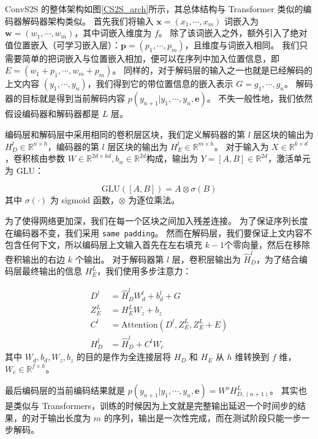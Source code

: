 ConvS2S 的整体架构如图\ref{CS2S_arch}所示，其总体结构与 Transformer 类似的编码器解码器架构类似。
首先我们将输入 $\bm{x} = (x_1, \cdots, x_m)$ 词嵌入为 $\bm{w} = (w_1, \cdots, w_m)$，其中词嵌入维度为 $f$。
除了该词嵌入之外，额外引入了绝对值位置嵌入（可学习嵌入层）：$\bm{p} = (p_1, \cdots, p_m)$，且维度与词嵌入相同。
我们只需要简单的把词嵌入与位置嵌入相加，便可以在序列中加入位置信息，即 $E = (w_1 + p_1, \cdots, w_m + p_m)$。
同样的，对于解码层的输入之一也就是已经解码的上文内容 $(y_1, \cdots, y_n)$，我们得到它的带位置信息的嵌入表示 $G = g_1, \cdots, g_n$。
解码器的目标就是得到当前解码内容 $p(y_{n+1}|y_1,\cdots,y_n, \bm{e})$。
不失一般性地，我们依然假设编码器和解码器都是 $L$ 层。

编码层和解码层中采用相同的卷积层区块，我们定义解码器的第 $l$ 层区块的输出为 $H_D^l \in \mathbb{R}^{n \times h}$，编码器的第 $l$ 层区块的输出为 $H_E^l \in \mathbb{R}^{m \times h}$。
对于输入为 $X \in \mathbb{R}^{k \times d}$，卷积核由参数 $W \in \mathbb{R}^{2d \times kd}, b_w \in \mathbb{R}^{2d}$构成，输出为 $Y = [A, B] \in \mathbb{R}^{2d}$，激活单元为 GLU\cite{GLU}：

\begin{equation}
	\text{GLU}([A, B]) = A \otimes \sigma(B)
\end{equation}
其中 $\sigma(\cdot)$ 为 sigmoid 函数，$\otimes$ 为逐位乘法。

为了使得网络更加深，我们在每一个区块之间加入残差连接。
为了保证序列长度在编码器不变，我们采用 \texttt{same padding}。
然而在解码层，我们要保证上文内容不包含任何下文，所以编码层上文输入首先在左右填充 $k-1$个零向量，然后在移除卷积输出的右边 $k$ 个输出。
对于解码器第 $l$ 层，卷积层输出为 $\hat{H}_D^l$，为了结合编码层最终输出的信息 $H_E^L$，我们使用多步注意力：

\begin{align}
	D^l &= \hat{H}_D^l W_d^l + b_d^l + G \\
	Z_E^L &= H_E^L W_z + b_z \\
	C^l &= \text{Attention}(D^l, Z_E^L, Z_E^L + E) \\
	H_D^l &= \hat{H}^l_D + C^l W_c
\end{align}
其中 $W_d, b_d, W_z, b_z$ 的目的是作为全连接层将 $H_D$ 和 $H_E$ 从 $h$ 维转换到 $f$ 维，$W_c \in \mathbb{R}^{f \times h}$。

最后编码层的当前编码结果就是 $p(y_{n+1}|y_1,\cdots,y_n, \bm{e}) = W^o H_{D,(n+1)}^L$。
其实也是类似与 Transformers，训练的时候因为上文就是完整输出延迟一个时间步的结果，的对于输出长度为 $m$ 的序列，输出是一次性完成，而在测试阶段只能一步一步解码。


